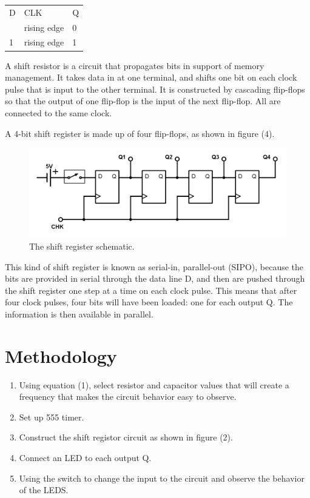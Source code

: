 \documentclass[twocolumn, amsmath]{revtex4}
\begin{document}
\begin{center}
	\begin{ruledtabular}
    \begin{tabular}{ l l l}
	D & CLK & Q\\ \colrule
	0 & rising edge & 0 \\
	1 & rising edge & 1 \\
\end{tabular}
    \end{ruledtabular}
\end{center}

A shift resistor is a circuit that propagates bits in support of memory management. It takes data in at one terminal, and shifts one bit on each clock pulse that is input to the other terminal. It is constructed by cascading flip-flops so that the output of one flip-flop is the input of the next flip-flop. All are connected to the same clock. 

A 4-bit shift register is made up of four flip-flops, as shown in figure (4). 

\begin{figure}[h]
    \includegraphics[scale=0.26]{bitshifter.png}  
    \caption{The shift register schematic.}
\end{figure}

This kind of shift register is known as serial-in, parallel-out (SIPO), because the bits are provided in serial through the data line D, and then are pushed through the shift register one step at a time on each clock pulse. 
This means that after four clock pulses, four bits will have been loaded: one for each output Q. The information is then available in parallel.


\section{Methodology}

\begin{enumerate}
	\item Using equation (1), select resistor and capacitor values that will create a frequency that makes the circuit behavior easy to observe.
	\item Set up 555 timer.
    \item Construct the shift registor circuit as shown in figure (2). 
    \item Connect an LED to each output Q.
    \item Using the switch to change the input to the circuit and observe the behavior of the LEDS.
\end{enumerate}
\end{document}

